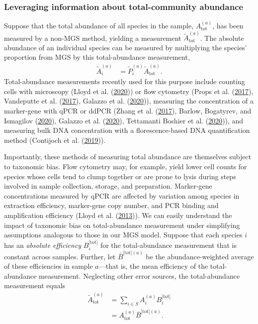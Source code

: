 \documentclass[
]{article}
\begin{document}
\hypertarget{leveraging-information-about-total-community-abundance}{%
\subsubsection{Leveraging information about total-community abundance}\label{leveraging-information-about-total-community-abundance}}

Suppose that the total abundance of all species in the sample, \(A_{{\text{tot}}}^{(a)}\), has been measured by a non-MGS method, yielding a measurement \(\tilde A_{\text{tot}}^{(a)}\).
The absolute abundance of an individual species can be measured by multiplying the species' proportion from MGS by this total-abundance measurement,
\begin{align}
  \label{eq:density-prop-meas}
  \tilde A_i^{(a)} &= \tilde P_i^{(a)} \tilde A_{\text{tot}}^{(a)}.
\end{align}
Total-abundance measurements recently used for this purpose include counting cells with microscopy (Lloyd et al. (\protect\hyperlink{ref-lloyd2020evid}{2020})) or flow cytometry (Props et al. (\protect\hyperlink{ref-props2017abso}{2017}), Vandeputte et al. (\protect\hyperlink{ref-vandeputte2017quan}{2017}), Galazzo et al. (\protect\hyperlink{ref-galazzo2020howt}{2020})), measuring the concentration of a marker-gene with qPCR or ddPCR (Zhang et al. (\protect\hyperlink{ref-zhang2017soil}{2017}), Barlow, Bogatyrev, and Ismagilov (\protect\hyperlink{ref-barlow2020aqau}{2020}), Galazzo et al. (\protect\hyperlink{ref-galazzo2020howt}{2020}), Tettamanti Boshier et al. (\protect\hyperlink{ref-tettamantiboshier2020comp}{2020})), and measuring bulk DNA concentration with a florescence-based DNA quantification method (Contijoch et al. (\protect\hyperlink{ref-contijoch2019gutm}{2019})).

Importantly, these methods of measuring total abundance are themselves subject to taxonomic bias.
Flow cytometry may, for example, yield lower cell counts for species whose cells tend to clump together or are prone to lysis during steps involved in sample collection, storage, and preparation.
Marker-gene concentrations measured by qPCR are affected by variation among species in extraction efficiency, marker-gene copy number, and PCR binding and amplification efficiency (Lloyd et al. (\protect\hyperlink{ref-lloyd2013meta}{2013})).
We can easily understand the impact of taxonomic bias on total-abundance measurement under simplifying assumptions analogous to those in our MGS model.
Suppose that each species \(i\) has an \emph{absolute efficiency} \(B_{i}^{{\text{[tot]}}}\) for the total-abundance measurement that is constant across samples.
Further, let \(\bar B^{{\text{[tot]}}(a)}\) be the abundance-weighted average of these efficiencies in sample \(a\)---that is, the mean efficiency of the total-abundance measurement.
Neglecting other error sources, the total-abundance measurement equals
\begin{align}
  \label{eq:total-density-error}
  \tilde A_{\text{tot}}^{(a)} 
  &= \sum_{i\in S} A_i^{(a)} B_{i}^{{\text{[tot]}}}
  \\&= A_{\text{tot}}^{(a)} \bar B^{{\text{[tot]}}(a)}.
\end{align}
\end{document}
